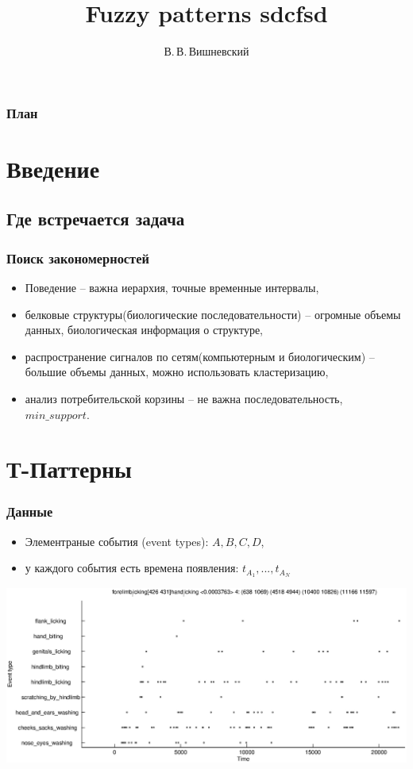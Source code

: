 \documentclass[smaller]{beamer}
\title{Fuzzy patterns sdcfsd } %
\author[Вишневский] %
{В.\,В.\,Вишневский\inst{1}}
\institute[МГУ ВМК, ММП] %
{
  \inst{1}
  МГУ, ВМиК, каф. ММП
}
\date[Patterns] %
{}
\begin{document}
\begin{frame}
  \titlepage
\end{frame}

\begin{frame}
  \frametitle{План}
  \tableofcontents
\end{frame}

\section{Введение}
\subsection{Где встречается задача}

\begin{frame}
  \frametitle{Поиск закономерностей}
\begin{itemize}
  \item Поведение -- важна иерархия, точные временные интервалы,
  \item белковые структуры(биологические последовательности) -- огромные объемы данных, биологическая информация о структуре,
  \item распространение сигналов по сетям(компьютерным и биологическим) -- большие объемы данных, можно использовать кластеризацию,
  \item анализ потребительской корзины -- не важна последовательность, $min\_support$.
  \end{itemize}
\end{frame}

\section{Т-Паттерны}

\begin{frame}
  \frametitle{Данные}
  \begin{itemize}
  \item Элементраные события (event types): $A,B,C,D$,
  \item у каждого события есть времена появления: $t_{A_1},...,t_{A_N}$ 
  \end{itemize}
  
    \begin{center}
      \includegraphics[scale=0.35]{TS.eps}
    \end{center}
\end{frame}
\end{document}
